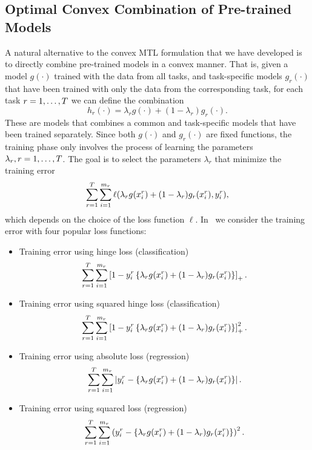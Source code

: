 \subsection{Optimal Convex Combination of Pre-trained Models}\label{subsec:optimal_comb}
A natural alternative to the convex MTL formulation that we have developed is to directly combine pre-trained models in a convex manner. That is, given a model $g(\cdot)$ trained with the data from all tasks, and task-specific models $g_r(\cdot)$ that have been trained with only the data from the corresponding task, for each task $r=1,\ldots,T$ we can define the combination
\begin{equation}
    \nonumber
    h_r(\cdot) = \lambda_r g(\cdot) + (1 - \lambda_r) g_r(\cdot) .
\end{equation}
These are models that combines a common and task-specific models that have been trained separately. Since both $g(\cdot)$ and $g_r(\cdot)$ are fixed functions, the training phase only involves the process of learning the parameters $\lambda_r, r=1, \ldots, T$. The goal is to select the parameters $\lambda_r$ that minimize the training error
\begin{equation}
    \nonumber
    \sum_{r=1}^T \sum_{i=1}^{m_r} \ell(\lambda_r g(x_i^r) + (1 - \lambda_r) g_r(x_i^r), y_i^r) ,
\end{equation}
which depends on the choice of the loss function $\ell$. 
In~\cite{RuizAD21} we consider the training error with four popular loss functions:
\begin{itemize}
    \item Training error using hinge loss (classification)
    \begin{equation}
        \nonumber
        \sum_{r=1}^T \sum_{i=1}^{m_r} \left[1 - y_i^r \left\lbrace\lambda_r g(x_i^r) + (1 - \lambda_r) g_r(x_i^r) \right \rbrace\right]_{+} .
    \end{equation}
    \item Training error using squared hinge loss (classification)
    \begin{equation}
        \nonumber
        \sum_{r=1}^T \sum_{i=1}^{m_r} \left[1 - y_i^r \left\lbrace\lambda_r g(x_i^r) + (1 - \lambda_r) g_r(x_i^r) \right \rbrace\right]_{+}^2 .
    \end{equation}
    \item Training error using absolute loss (regression)
    \begin{equation}
        \nonumber
        \sum_{r=1}^T \sum_{i=1}^{m_r} \left|y_i^r - \left\lbrace\lambda_r g(x_i^r) + (1 - \lambda_r) g_r(x_i^r) \right \rbrace\right| .
    \end{equation}
    \item Training error using squared loss (regression)
    \begin{equation}
        \nonumber
        \sum_{r=1}^T \sum_{i=1}^{m_r} \left( {y_i^r - \left\lbrace\lambda_r g(x_i^r) + (1 - \lambda_r) g_r(x_i^r) \right \rbrace} \right)^2 .
    \end{equation}
\end{itemize}
